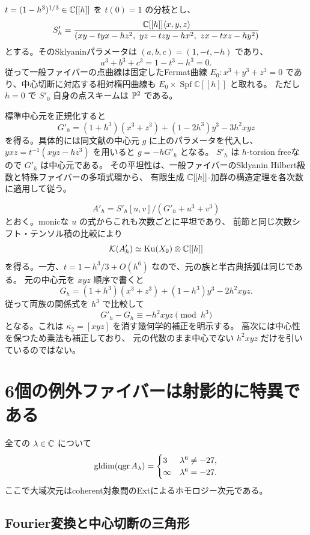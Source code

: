 $t=(1-h^3)^{1/3}\in\mathbb C[[h]]$ を $t(0)=1$ の分枝とし、
\[
 S'_h=\frac{\mathbb C[[h]]\langle x,y,z\rangle}
 {(xy-tyx-hz^2,\ yz-tzy-hx^2,\ zx-txz-hy^2)}
\]
とする。そのSklyaninパラメータは $(a,b,c)=(1,-t,-h)$ であり、
\[
 a^3+b^3+c^3=1-t^3-h^3=0.
\]
従って一般ファイバーの点曲線は固定したFermat曲線
$E_0:x^3+y^3+z^3=0$ であり、中心切断に対応する相対楕円曲線も
$E_0\times\operatorname{Spf}\mathbb C[[h]]$ と取れる。
ただし $h=0$ で $S'_0$ 自身の点スキームは $\mathbb P^2$ である。

標準中心元\cite[Lemma 2.19]{WWY}を正規化すると
\[
 G'_h=(1+h^3)(x^3+z^3)+(1-2h^3)y^3-3h^2xyz
\]
を得る。具体的には同文献の中心元 $g$ に上のパラメータを代入し、
$yxz=t^{-1}(xyz-hz^3)$ を用いると $g=-hG'_h$ となる。
$S'_h$ は $h$-torsion freeなので $G'_h$ は中心元である。
その平坦性は、一般ファイバーのSklyanin Hilbert級数と特殊ファイバーの多項式環から、
有限生成 $\mathbb C[[h]]$-加群の構造定理を各次数に適用して従う。

\[
 A'_h=S'_h[u,v]/(G'_h+u^3+v^3)
\]
とおく。monicな $u$ の式からこれも次数ごとに平坦であり、
前節と同じ次数シフト・テンソル積の比較により
\[
 \mathcal K(A'_h)\simeq\operatorname{Ku}(X_0)\otimes\mathbb C[[h]]
\]
を得る。一方、$t=1-h^3/3+O(h^6)$ なので、元の族と半古典括弧は同じである。
元の中心元を $xyz$ 順序で書くと
\[
 G_h=(1+h^3)(x^3+z^3)+(1-h^3)y^3-2h^2xyz.
\]
従って両族の関係式を $h^3$ で比較して
\[
 G'_h-G_h\equiv-h^2xyz\pmod{h^3}
\]
となる。これは $\kappa_2=[xyz]$ を消す幾何学的補正を明示する。
高次には中心性を保つため乗法も補正しており、
元の代数のまま中心でない $h^2xyz$ だけを引いているのではない。

\section{6個の例外ファイバーは射影的に特異である}\label{sec:exceptional}

\begin{theorem}\label{thm:exceptional}
全ての $\lambda\in\mathbb C$ について
\[
 \operatorname{gldim}(\operatorname{qgr} A_\lambda)=
 \begin{cases}
 3&\lambda^6\ne-27,\\
 \infty&\lambda^6=-27.
 \end{cases}
\]
ここで大域次元はcoherent対象間のExtによるホモロジー次元である。
\end{theorem}

\subsection{Fourier変換と中心切断の三角形}

